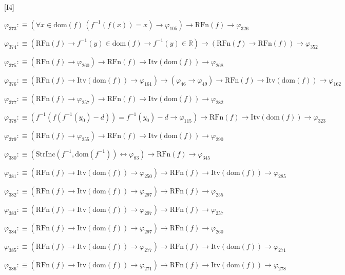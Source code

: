 \begin{fullproof}{[I4]}
\begin{abbrevlist}
\item $\varphi_{373} :\equiv (\forall x \in \mathrm{dom}(f)\,(f^{-1}(f(x)) = x) \to \varphi_{105}) \to \mathrm{RFn}(f) \to \varphi_{326}$
\item $\varphi_{374} :\equiv (\mathrm{RFn}(f) \to f^{-1}(y) \in \mathrm{dom}(f) \to f^{-1}(y) \in \mathbb{R}) \to (\mathrm{RFn}(f) \to \mathrm{RFn}(f)) \to \varphi_{352}$
\item $\varphi_{375} :\equiv (\mathrm{RFn}(f) \to \varphi_{260}) \to \mathrm{RFn}(f) \to \mathrm{Itv}(\mathrm{dom}(f)) \to \varphi_{268}$
\item $\varphi_{376} :\equiv (\mathrm{RFn}(f) \to \mathrm{Itv}(\mathrm{dom}(f)) \to \varphi_{161}) \to (\varphi_{46} \to \varphi_{49}) \to \mathrm{RFn}(f) \to \mathrm{Itv}(\mathrm{dom}(f)) \to \varphi_{162}$
\item $\varphi_{377} :\equiv (\mathrm{RFn}(f) \to \varphi_{257}) \to \mathrm{RFn}(f) \to \mathrm{Itv}(\mathrm{dom}(f)) \to \varphi_{282}$
\item $\varphi_{378} :\equiv (f^{-1}(f(f^{-1}(y_{0}) - d)) = f^{-1}(y_{0}) - d \to \varphi_{115}) \to \mathrm{RFn}(f) \to \mathrm{Itv}(\mathrm{dom}(f)) \to \varphi_{323}$
\item $\varphi_{379} :\equiv (\mathrm{RFn}(f) \to \varphi_{255}) \to \mathrm{RFn}(f) \to \mathrm{Itv}(\mathrm{dom}(f)) \to \varphi_{290}$
\item $\varphi_{380} :\equiv (\mathrm{StrInc}(f^{-1},\mathrm{dom}(f^{-1})) \leftrightarrow \varphi_{83}) \to \mathrm{RFn}(f) \to \varphi_{345}$
\item $\varphi_{381} :\equiv (\mathrm{RFn}(f) \to \mathrm{Itv}(\mathrm{dom}(f)) \to \varphi_{250}) \to \mathrm{RFn}(f) \to \mathrm{Itv}(\mathrm{dom}(f)) \to \varphi_{285}$
\item $\varphi_{382} :\equiv (\mathrm{RFn}(f) \to \mathrm{Itv}(\mathrm{dom}(f)) \to \varphi_{297}) \to \mathrm{RFn}(f) \to \varphi_{255}$
\item $\varphi_{383} :\equiv (\mathrm{RFn}(f) \to \mathrm{Itv}(\mathrm{dom}(f)) \to \varphi_{297}) \to \mathrm{RFn}(f) \to \varphi_{257}$
\item $\varphi_{384} :\equiv (\mathrm{RFn}(f) \to \mathrm{Itv}(\mathrm{dom}(f)) \to \varphi_{297}) \to \mathrm{RFn}(f) \to \varphi_{260}$
\item $\varphi_{385} :\equiv (\mathrm{RFn}(f) \to \mathrm{Itv}(\mathrm{dom}(f)) \to \varphi_{277}) \to \mathrm{RFn}(f) \to \mathrm{Itv}(\mathrm{dom}(f)) \to \varphi_{271}$
\item $\varphi_{386} :\equiv (\mathrm{RFn}(f) \to \mathrm{Itv}(\mathrm{dom}(f)) \to \varphi_{271}) \to \mathrm{RFn}(f) \to \mathrm{Itv}(\mathrm{dom}(f)) \to \varphi_{278}$

\end{abbrevlist}
\end{fullproof}
